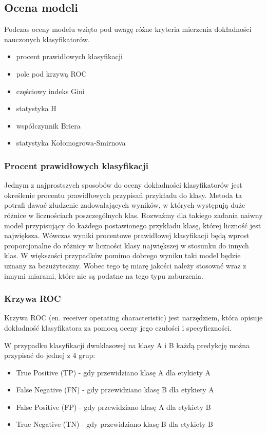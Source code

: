 \documentclass[a4paper, twoside, 11pt, openright]{article}
\begin{document}
\subsection{Ocena modeli}

Podczas oceny modelu wzięto pod uwagę różne kryteria mierzenia dokładności nauczonych klasyfikatorów.
\begin{itemize}
\item procent prawidłowych klasyfikacji
\item pole pod krzywą ROC
\item częściowy indeks Gini
\item statystyka H
\item współczynnik Briera
\item statystyka Kołomogrowa-Smirnova
\end{itemize}

\subsubsection{Procent prawidłowych klasyfikacji}

Jednym z najprostszych sposobów do oceny dokładności klasyfikatorów jest określenie procentu prawidłowych przypisań przykładu do klasy. Metoda ta potrafi dawać złudzenie zadowalających wyników, w których występują duże różnice w licznościach poszczególnych klas. Rozważmy dla takiego zadania naiwny model przypisujący do każdego postawionego przykładu klasę, której liczność jest największa. Wówczas wyniki procentowe prawidłowej klasyfikacji będą wprost proporcjonalne do różnicy w liczności klasy największej w stosunku do innych klas. W większości przypadków pomimo dobrego wyniku taki model będzie uznany za bezużyteczny. Wobec tego tę miarę jakości należy stosować wraz z innymi miarami, które nie są podatne na tego typu zaburzenia.

\subsubsection{Krzywa ROC \cite{roc}}

Krzywa ROC (en. receiver operating characteristic) jest narzędziem, która opisuje dokładność klasyfikatora za pomocą oceny jego czułości i specyficzności.

 W przypadku klasyfikacji dwuklasowej na klasy A i B każdą predykcję można przypisać do jednej z 4 grup:
\begin{itemize}
\item True Positive (TP) - gdy przewidziano klasę A dla etykiety A
\item False Negative (FN) - gdy przewidziano klasę B dla etykiety A
\item False Positive (FP) - gdy przewidziano klasę A dla etykiety B
\item True Negative (TN) - gdy przewidziano klasę B dla etykiety B
\end{itemize}
\end{document}
